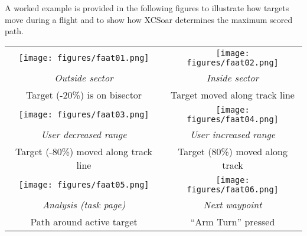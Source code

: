 A worked example is provided in the following figures to illustrate
how targets move during a flight and to show how XCSoar determines the
maximum scored path.

\begin{maxipage}
\begin{center}
\begin{longtable}{|c|c|}
\toprule
\texttt{[image: figures/faat01.png]} & 
\texttt{[image: figures/faat02.png]} \\
{\em Outside sector} & {\em Inside sector} \\
Target (-20\%) is on bisector & Target moved along track line \\

\midrule
\texttt{[image: figures/faat03.png]} & 
\texttt{[image: figures/faat04.png]} \\
{\em User decreased range} & {\em User increased range} \\
Target (-80\%) moved along track line & Target (80\%) moved along track \\

\midrule
\texttt{[image: figures/faat05.png]} & 
\texttt{[image: figures/faat06.png]} \\
{\em Analysis (task page)} & {\em Next waypoint} \\
Path around active target  & ``Arm Turn'' pressed \\
\bottomrule
\end{longtable}
\end{center}
\end{maxipage}

